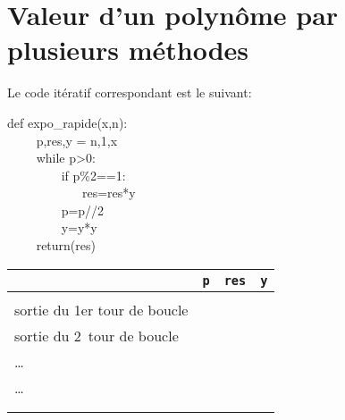 \section{Valeur d'un polynôme par plusieurs méthodes}

	



	Le code itératif correspondant est le suivant:
	
	\bigskip \begin{minipage}{0.5\linewidth}
	def expo\_rapide(x,n):\\
		 \textcolor{white}{aaaa}  p,res,y = n,1,x\\
	    \textcolor{white}{aaaa} while p>0:\\
		\textcolor{white}{aaaa}\textcolor{white}{aaaa} if p\%2==1:\\
		\textcolor{white}{aaaa}\textcolor{white}{aaaa}\textcolor{white}{aaaa}res=res*y\\
		\textcolor{white}{aaaa}\textcolor{white}{aaaa} p=p//2\\
		\textcolor{white}{aaaa}\textcolor{white}{aaaa} y=y*y\\
		\textcolor{white}{aaaa} return(res)\end{minipage}
	
	
	
	\begin{center}
		\begin{tabular}{|l|p{1cm}|p{1cm}|p{1cm}|}
			\hline & \texttt{p} & \texttt{res} & \texttt{y}\\
			\hline &&&\\
			sortie du 1{\textrm{er}} tour de boucle && & \\[3mm]
			sortie du 2\ieme\  tour de boucle && & \\[3mm]
			\ldots && & \\[3mm]
			\ldots&& & \\[3mm]
			&& & \\[3mm]
			&& & \\[3mm]
		\end{tabular}
		
	\end{center}
	
